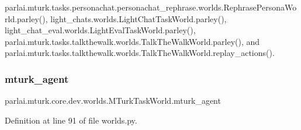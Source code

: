 parlai.\+mturk.\+tasks.\+personachat.\+personachat\+\_\+rephrase.\+worlds.\+Rephrase\+Persona\+World.\+parley(), light\+\_\+chats.\+worlds.\+Light\+Chat\+Task\+World.\+parley(), light\+\_\+chat\+\_\+eval.\+worlds.\+Light\+Eval\+Task\+World.\+parley(), parlai.\+mturk.\+tasks.\+talkthewalk.\+worlds.\+Talk\+The\+Walk\+World.\+parley(), and parlai.\+mturk.\+tasks.\+talkthewalk.\+worlds.\+Talk\+The\+Walk\+World.\+replay\+\_\+actions().

\mbox{\label{classparlai_1_1mturk_1_1core_1_1dev_1_1worlds_1_1MTurkTaskWorld_ac57f970ab26bb0526c73c03c1b8cad70}} 
\subsubsection{\texorpdfstring{mturk\+\_\+agent}{mturk\_agent}}
{\footnotesize\ttfamily parlai.\+mturk.\+core.\+dev.\+worlds.\+M\+Turk\+Task\+World.\+mturk\+\_\+agent}



Definition at line 91 of file worlds.\+py.



